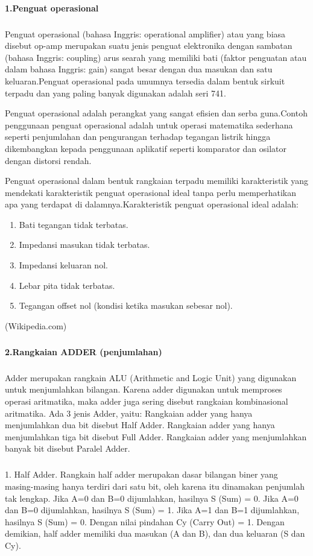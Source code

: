 \documentclass[12pt,a4paper]{article}
\begin{document}
\paragraph{ }
\textbf{1.Penguat operasional}
\subparagraph{ }
 Penguat operasional (bahasa Inggris: operational amplifier) atau yang biasa disebut op-amp merupakan suatu jenis penguat elektronika dengan sambatan (bahasa Inggris: coupling) arus searah yang memiliki bati (faktor penguatan atau dalam bahasa Inggris: gain) sangat besar dengan dua masukan dan satu keluaran.Penguat operasional pada umumnya tersedia dalam bentuk sirkuit terpadu dan yang paling banyak digunakan adalah seri 741.

Penguat operasional adalah perangkat yang sangat efisien dan serba guna.Contoh penggunaan penguat operasional adalah untuk operasi matematika sederhana seperti penjumlahan dan pengurangan terhadap tegangan listrik hingga dikembangkan kepada penggunaan aplikatif seperti komparator dan osilator dengan distorsi rendah.

Penguat operasional dalam bentuk rangkaian terpadu memiliki karakteristik yang mendekati karakteristik penguat operasional ideal tanpa perlu memperhatikan apa yang terdapat di dalamnya.Karakteristik penguat operasional ideal adalah:
\begin{enumerate}
\item Bati tegangan tidak terbatas.
\item Impedansi masukan tidak terbatas.
\item Impedansi keluaran nol.
\item Lebar pita tidak terbatas.
\item Tegangan offset nol (kondisi ketika masukan sebesar nol).
\end{enumerate}
	
\begin{flushright}
(Wikipedia.com)
\end{flushright}

\subparagraph{ }
\textbf{2.Rangkaian ADDER (penjumlahan)}
\subparagraph{ }
 Adder merupakan rangkain ALU (Arithmetic and Logic Unit) yang digunakan untuk menjumlahkan bilangan. Karena adder digunakan untuk memproses operasi aritmatika, maka adder juga sering disebut rangkaian kombinasional aritmatika. Ada 3 jenis Adder, yaitu:
Rangkaian adder yang hanya menjumlahkan dua bit disebut Half Adder.
Rangkaian adder yang hanya menjumlahkan tiga bit disebut Full Adder.
Rangkaian adder yang menjumlahkan banyak bit disebut Paralel Adder.
\subparagraph{ }
1. Half Adder.
Rangkain half adder merupakan dasar bilangan biner yang masing-masing hanya terdiri dari satu bit, oleh karena itu dinamakan penjumlah tak lengkap.
Jika A=0 dan B=0 dijumlahkan, hasilnya S (Sum) = 0.
Jika A=0 dan B=0 dijumlahkan, hasilnya S (Sum) = 1.
Jika A=1 dan B=1 dijumlahkan, hasilnya S (Sum) = 0. Dengan nilai pindahan Cy (Carry Out) = 1.
Dengan demikian, half adder memiliki dua masukan (A dan B), dan dua keluaran (S dan Cy). 
\end{document}
